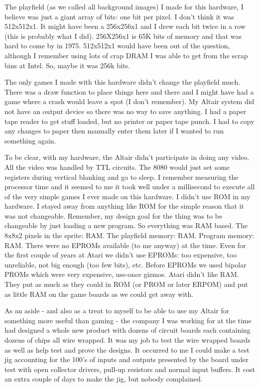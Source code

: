 The playfield (as we called all background images) I made for this hardware, I believe was just a giant array of bits: one bit per pixel. I don't think it was 512x512x1. It might have been a 256x256x1 and I drew each bit twice in a row (this is probably what I did). 256X256x1 is 65K bits of memory and that was hard to come by in 1975. 512x512x1 would have been out of the question, although I remember using lots of crap DRAM I was able to get from the scrap bins at Intel. So, maybe it was 256k bits. 

The only games I made with this hardware didn't change the playfield much. There was a draw function to place things here and there and I might have had a game where a crash would leave a spot (I don't remember). My Altair system did not have an output device so there was no way to save anything. I had a paper tape reader to get stuff loaded, but no printer or paper tape punch. I had to copy any changes to paper then manually enter them later if I wanted to run something again. 

To be clear, with my hardware, the Altair didn't participate in doing any video. All the video was handled by TTL circuits. The 8080 would just set some registers during vertical blanking and go to sleep. I remember measuring the processor time and it seemed to me it took well under a millisecond to execute all of the very simple games I ever made on this hardware.
I didn’t use ROM in my hardware. I stayed away from anything like ROM for the simple reason that it was not changeable. Remember, my design goal for the thing was to be changeable by just loading a new program. So everything was RAM based. The 8x8x2 pixels in the sprite: RAM. The playfield memory: RAM. Program memory: RAM. 
There were no EPROMs available (to me anyway) at the time. Even for the first couple of years at Atari we didn't use EPROMs: too expensive, too unreliable, not big enough (too few bits), etc. Before EPROMs we used bipolar PROMs which were very expensive, use-once gizmos. Atari didn't like RAM. They put as much as they could in ROM (or PROM or later ERPOM) and put as little RAM on the game boards as we could get away with.

As an aside - and also as a treat to myself to be able to use my Altair for something more useful than gaming - the company I was working for at the time had designed a whole new product with dozens of circuit boards each containing dozens of chips all wire wrapped. It was my job to test the wire wrapped boards as well as help test and prove the designs. It occurred to me I could make a test jig accounting for the 100's of inputs and outputs presented by the board under test with open collector drivers, pull-up resistors and normal input buffers. It cost an extra couple of days to make the jig, but nobody complained. 

